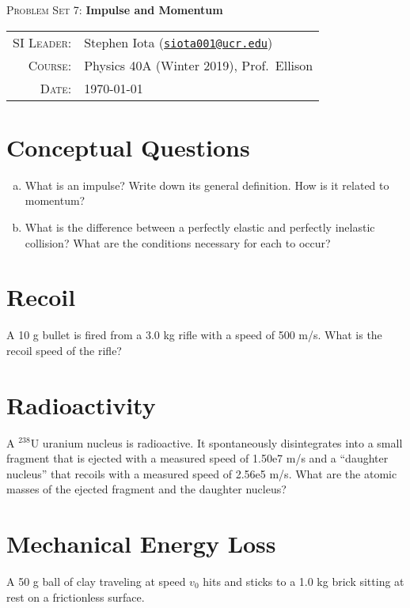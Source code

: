 \documentclass[12pt]{article}
\newcommand{\email}[1]{\texttt{\href{mailto:#1}{#1}}}
\begin{document}
\begin{center}

\Large{\textsc{Problem Set 7}: \textbf{Impulse and Momentum}}
\end{center}
\vspace{.5mm}



\begin{tabular}{rl}
\textsc{SI Leader}:
&
Stephen Iota (\email{siota001@ucr.edu})
\\
\textsc{Course}:
&
Physics 40A (Winter 2019), Prof.~Ellison
\\
\textsc{Date}:
&
\today
\end{tabular}



\section{Conceptual Questions}

\begin{enumerate}[(a)]
	\item What is an impulse? Write down its general definition. How is it related to momentum?
	\item What is the difference between a perfectly elastic and perfectly inelastic collision? What are the conditions necessary for each to occur?

\end{enumerate}


\section{Recoil}

A 10 g bullet is fired from a 3.0 kg rifle with a speed of 500 m/s. What is the recoil speed of the rifle?


\section{Radioactivity}

A $^{238}$U uranium nucleus is radioactive. It spontaneously disintegrates into a small fragment that is ejected with a measured speed of 1.50e7 m/s and a ``daughter nucleus'' that recoils with a measured speed of 2.56e5 m/s. What are the atomic masses of the ejected fragment and the daughter nucleus? 


\section{Mechanical Energy Loss}
A 50 g ball of clay traveling at speed $v_0$ hits and sticks to a 1.0 kg brick sitting at rest on a frictionless surface.
\end{document}
